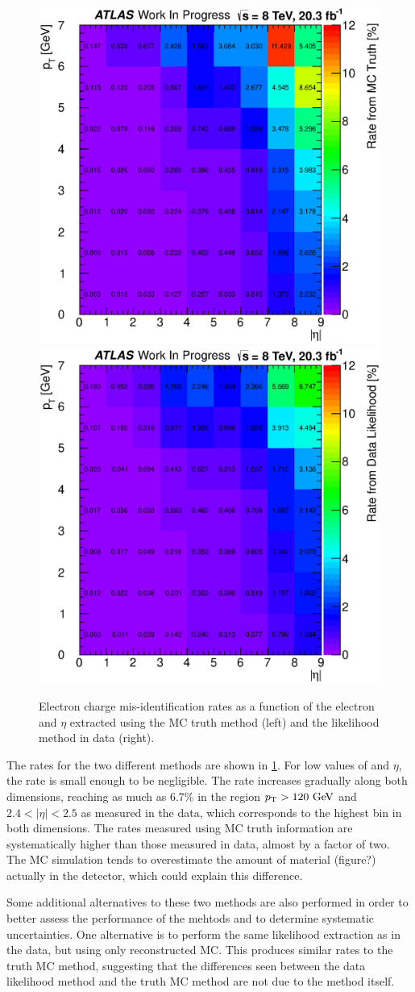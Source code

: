 \begin{figure}[htp]
\centering
\includegraphics[width=0.45\columnwidth]{figures/ChargeMisID/Nov5_2015_TruthRates_Plot.eps}
\includegraphics[width=0.45\columnwidth]{figures/ChargeMisID/Nov5_2015_DataRates_Plot.eps}
\caption{Electron charge mis-identification rates as a function of
the electron \pt and $\eta$ extracted using the MC
truth method (left) and the likelihood method in data (right). }
\label{fig:chargemisid_rates_contour}
\end{figure}

The rates for the two different methods are 
shown in \fig\ref{fig:chargemisid_rates_contour}.
For low values of \pt and $\eta$, the rate is small enough to be negligible. 
The rate increases gradually along both dimensions, reaching as much as
6.7\% in the region $\pt > 120\GeV$ and $2.4 < |\eta| < 2.5$ as measured
in the data, which corresponds to the highest bin in both dimensions. 
The rates measured using MC truth information are systematically higher
than those measured in data, almost by a factor of two. The MC simulation
tends to overestimate the amount of material (figure?) actually in the
detector, which could explain this difference.

Some additional alternatives to these two methods are also performed
in order to better assess the performance of the mehtods
and to determine systematic uncertainties.
One alternative is to perform the same likelihood extraction
as in the data, but using only reconstructed MC. This produces
similar rates to the truth MC method, suggesting that the differences
seen between the data likelihood method and the truth MC method
are not due to the method itself. 

